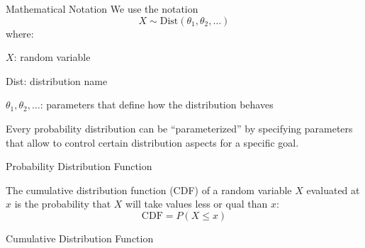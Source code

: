 \begin{frame}{Mathematical Notation}
	We use the notation
	$$X \sim \text{Dist}(\theta_1, \theta_2, \dots)$$
	where:
	\begin{vfilleditems}
		\item $X$: random variable
		\item Dist: distribution name
		\item $\theta_1, \theta_2, \dots$: parameters that define how the
		distribution behaves
	\end{vfilleditems}
	Every probability distribution can be ``parameterized'' by specifying
	parameters that allow to control certain distribution aspects for
	a specific goal.
\end{frame}

\begin{frame}{Probability Distribution Function}
	\centering
\end{frame}

\begin{frame}
	\begin{defn}
		The cumulative distribution function (CDF) of a random variable
		$X$ evaluated at $x$ is the probability that $X$ will take
		values less or qual than $x$:
		$$\text{CDF} = P(X \leq x)$$
	\end{defn}
\end{frame}

\begin{frame}{Cumulative Distribution Function}
	\centering
\end{frame}

